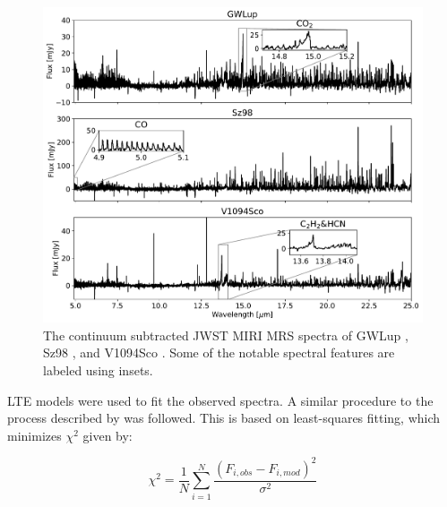 \documentclass[twoside, single, authoryear, semicolon, 12pt]{lion-msc}
\newcommand{\4}{$_4$}
\newcommand{\3}{$_3$}
\newcommand{\2}{$_2$}
\begin{document}
\begin{figure}[H]
    \centering
    \includegraphics[width=\linewidth]{Figures/Measurements.pdf}
    \caption{The continuum subtracted JWST MIRI MRS spectra of GWLup \citep{Gasman_2023}, Sz98 \citep{Grant_2023}, and V1094Sco \citep{taboneinprepp}. Some of the notable spectral features are labeled using insets.}
    \label{fig: Measurements}
\end{figure}

LTE models were used to fit the observed spectra. A similar procedure to the process described by \cite{Grant_2023} was followed. This is based on least-squares fitting, which minimizes $\chi^2$ given by:

\begin{equation}
    \chi^2=\frac{1}{N}\sum_{i=1}^N\frac{(F_{i,obs}-F_{i, mod})^2}{\sigma^2}
    \label{eq: chi-square}
\end{equation}
\end{document}
